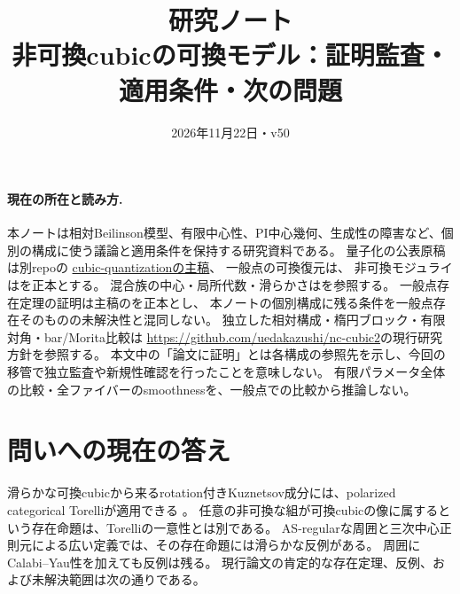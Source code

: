 
\usepackage{fancyhdr}
\pagestyle{fancy}
\fancyhf{}
\fancyfoot[C]{\thepage}
\setlength{\headheight}{15pt}
\title{研究ノート\\\large 非可換cubicの可換モデル：証明監査・適用条件・次の問題}
\author{}
\date{2026年11月22日・v50}

\maketitle
\thispagestyle{plain}
\paragraph{現在の所在と読み方.}
本ノートは相対Beilinson模型、有限中心性、PI中心幾何、生成性の障害など、個別の構成に使う議論と適用条件を保持する研究資料である。
量子化の公表原稿は別repoの
\href{https://github.com/uedakazushi/cubic-quantization/blob/main/papers/cubic-quantization.tex}{cubic-quantizationの主稿}、
一般点の可換復元は、
非可換モジュライはを正本とする。
混合族の中心・局所代数・滑らかさはを参照する。
一般点存在定理の証明は主稿のを正本とし、
本ノートの個別構成に残る条件を一般点存在そのものの未解決性と混同しない。
独立した相対構成・楕円ブロック・有限対角・bar/Morita比較は
\url{https://github.com/uedakazushi/nc-cubic2}の現行研究方針を参照する。
本文中の「論文に証明」とは各構成の参照先を示し、今回の移管で独立監査や新規性確認を行ったことを意味しない。
有限パラメータ全体の比較・全ファイバーのsmoothnessを、一般点での比較から推論しない。

\tableofcontents

\section{問いへの現在の答え}

滑らかな可換cubicから来るrotation付きKuznetsov成分には、polarized categorical
Torelliが適用できる \cite[Theorem 1.7]{LZ}。
任意の非可換な組が可換cubicの像に属するという存在命題は、Torelliの一意性とは別である。
AS-regularな周囲と三次中心正則元による広い定義では、その存在命題には滑らかな反例がある。
周囲にCalabi--Yau性を加えても反例は残る。
現行論文の肯定的な存在定理、反例、および未解決範囲は次の通りである。

